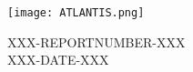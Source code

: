 \documentclass[11pt]{article}
\begin{document}
\vbox{}
\vskip60mm
\begin{sideways}
\begin{minipage}[t]{10mm}
\texttt{[image: ATLANTIS.png]}
\end{minipage}
\begin{minipage}[t]{100mm}
\vbox{}\vskip-10mm
XXX-REPORTNUMBER-XXX\\
\small
XXX-DATE-XXX
\end{minipage}
\end{sideways}
\vfill
\end{document}
